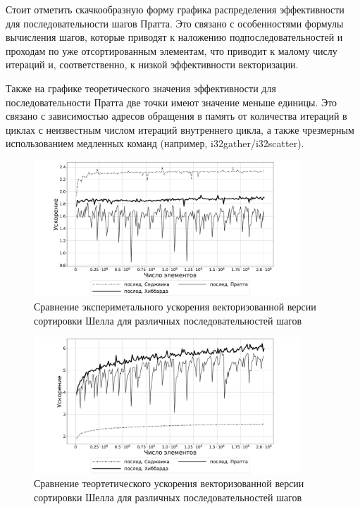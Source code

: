 \documentclass[utf8]{psta}
\begin{document}
Стоит отметить скачкообразную форму графика распределения эффективности для последовательности шагов Пратта. 
Это связано с особенностями формулы вычисления шагов, которые приводят к наложению подпоследовательностей и проходам по уже отсортированным элементам, что приводит к малому числу итераций и, соответственно, к низкой эффективности векторизации.

Также на графике теоретического значения эффективности для последовательности Пратта две точки имеют значение меньше единицы. 
Это связано с зависимостью адресов обращения в память от количества итераций в циклах с неизвестным числом итераций внутреннего цикла, а также чрезмерным использованием медленных команд (например, i32gather/i32scatter).

\begin{figure}
\includegraphics[width=10cm]{pics/experimental_eff}
\caption{Сравнение экспериметального ускорения векторизованной версии сортировки Шелла для различных последовательностей шагов}
\label{pic:acc_theor}
\end{figure}

\begin{figure}
\includegraphics[width=10cm]{pics/theoretical_eff}
\caption{Сравнение теортетического ускорения векторизованной версии сортировки Шелла для различных последовательностей шагов}
\label{pic:acc_exp}
\end{figure}
\end{document}

